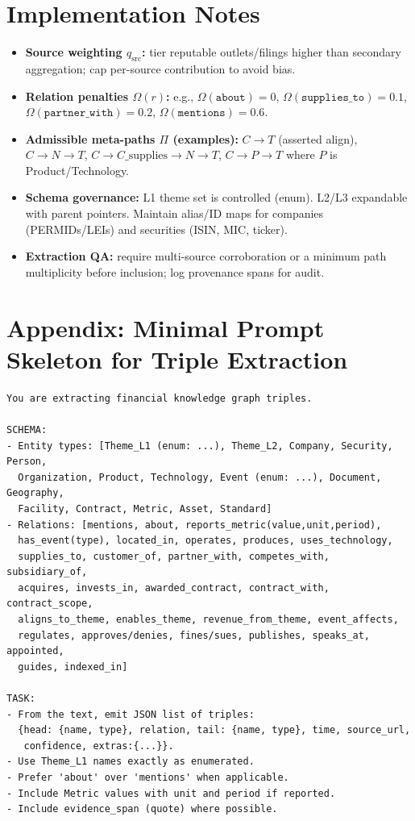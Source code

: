 \documentclass[11pt]{article}
\begin{document}
\section{Implementation Notes}
\begin{itemize}[leftmargin=*]
\item \textbf{Source weighting $q_{\text{src}}$:} tier reputable outlets/filings higher than secondary aggregation; cap per-source contribution to avoid bias.
\item \textbf{Relation penalties $\Omega(r)$:} e.g., $\Omega(\texttt{about})=0$, $\Omega(\texttt{supplies\_to})=0.1$, $\Omega(\texttt{partner\_with})=0.2$, $\Omega(\texttt{mentions})=0.6$.
\item \textbf{Admissible meta-paths $\Pi$ (examples):} $C\!\to\!T$ (asserted align), $C\!\to\!N\!\to\!T$, $C\!\to\!C\_{\text{supplies}}\!\to\!N\!\to\!T$, $C\!\to\!P\!\to\!T$ where $P$ is Product/Technology.
\item \textbf{Schema governance:} L1 theme set is controlled (enum). L2/L3 expandable with parent pointers. Maintain alias/ID maps for companies (PERMIDs/LEIs) and securities (ISIN, MIC, ticker).
\item \textbf{Extraction QA:} require multi-source corroboration or a minimum path multiplicity before inclusion; log provenance spans for audit.
\end{itemize}

\section{Appendix: Minimal Prompt Skeleton for Triple Extraction}
\begin{verbatim}
You are extracting financial knowledge graph triples.

SCHEMA:
- Entity types: [Theme_L1 (enum: ...), Theme_L2, Company, Security, Person,
  Organization, Product, Technology, Event (enum: ...), Document, Geography,
  Facility, Contract, Metric, Asset, Standard]
- Relations: [mentions, about, reports_metric(value,unit,period),
  has_event(type), located_in, operates, produces, uses_technology,
  supplies_to, customer_of, partner_with, competes_with, subsidiary_of,
  acquires, invests_in, awarded_contract, contract_with, contract_scope,
  aligns_to_theme, enables_theme, revenue_from_theme, event_affects,
  regulates, approves/denies, fines/sues, publishes, speaks_at, appointed,
  guides, indexed_in]

TASK:
- From the text, emit JSON list of triples:
  {head: {name, type}, relation, tail: {name, type}, time, source_url,
   confidence, extras:{...}}.
- Use Theme_L1 names exactly as enumerated.
- Prefer 'about' over 'mentions' when applicable.
- Include Metric values with unit and period if reported.
- Include evidence_span (quote) where possible.
\end{verbatim}
\end{document}
